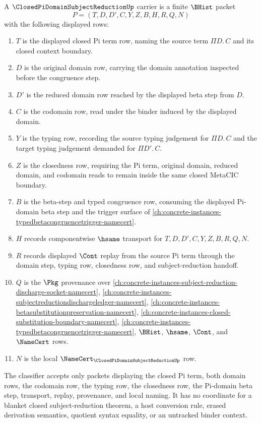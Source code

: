 \begin{definition}
\label{def:closed-pi-domain-subject-reduction-carrier}
A $\ClosedPiDomainSubjectReductionUp$ carrier is a finite $\BHist$ packet
$$
P=(T,D,D',C,Y,Z,B,H,R,Q,N)
$$
with the following displayed rows:
\begin{enumerate}
\item $T$ is the displayed closed Pi term row, naming the source term $\Pi D.\,C$ and its closed context boundary.
\item $D$ is the original domain row, carrying the domain annotation inspected before the congruence step.
\item $D'$ is the reduced domain row reached by the displayed beta step from $D$.
\item $C$ is the codomain row, read under the binder induced by the displayed domain.
\item $Y$ is the typing row, recording the source typing judgement for $\Pi D.\,C$ and the target typing judgement demanded for $\Pi D'.\,C$.
\item $Z$ is the closedness row, requiring the Pi term, original domain, reduced domain, and codomain reads to remain inside the same closed MetaCIC boundary.
\item $B$ is the beta-step and typed congruence row, consuming the displayed Pi-domain beta step and the trigger surface of \autoref{ch:concrete-instances-typedbetacongruencetrigger-namecert}.
\item $H$ records componentwise $\hsame$ transport for $T,D,D',C,Y,Z,B,R,Q,N$.
\item $R$ records displayed $\Cont$ replay from the source Pi term through the domain step, typing row, closedness row, and subject-reduction handoff.
\item $Q$ is the $\Pkg$ provenance over \autoref{ch:concrete-instances-subject-reduction-discharge-socket-namecert}, \autoref{ch:concrete-instances-subjectreductiondischargeledger-namecert}, \autoref{ch:concrete-instances-betasubstitutionpreservation-namecert}, \autoref{ch:concrete-instances-closed-substitution-boundary-namecert}, \autoref{ch:concrete-instances-typedbetacongruencetrigger-namecert}, $\BHist$, $\hsame$, $\Cont$, and $\NameCert$ rows.
\item $N$ is the local $\NameCert_{\ClosedPiDomainSubjectReductionUp}$ row.
\end{enumerate}
The classifier accepts only packets displaying the closed Pi term, both domain rows, the codomain row, the typing row, the closedness row, the Pi-domain beta step, transport, replay, provenance, and local naming. It has no coordinate for a blanket closed subject-reduction theorem, a host conversion rule, erased derivation semantics, quotient syntax equality, or an untracked binder context.
\end{definition}

